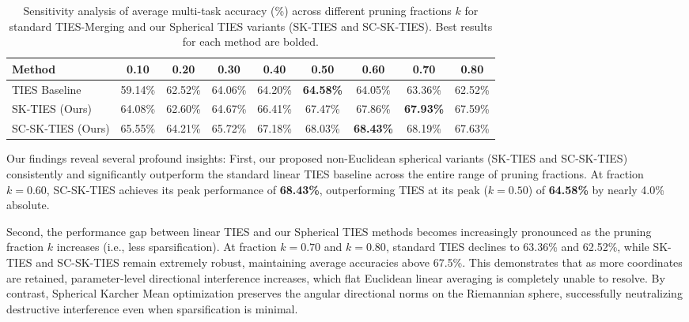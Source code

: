 \documentclass{article}
\begin{document}
\begin{table}[h]
\caption{Sensitivity analysis of average multi-task accuracy (\%) across different pruning fractions $k$ for standard TIES-Merging and our Spherical TIES variants (SK-TIES and SC-SK-TIES). Best results for each method are bolded.}
\label{table:fraction_sweep}
\vskip 0.15in
\begin{center}
\begin{small}
\begin{tabular}{lcccccccc}
\toprule
\textbf{Method} & \textbf{0.10} & \textbf{0.20} & \textbf{0.30} & \textbf{0.40} & \textbf{0.50} & \textbf{0.60} & \textbf{0.70} & \textbf{0.80} \\
\midrule
TIES Baseline & 59.14\% & 62.52\% & 64.06\% & 64.20\% & \textbf{64.58\%} & 64.05\% & 63.36\% & 62.52\% \\
SK-TIES (Ours) & 64.08\% & 62.60\% & 64.67\% & 66.41\% & 67.47\% & 67.86\% & \textbf{67.93\%} & 67.59\% \\
SC-SK-TIES (Ours) & 65.55\% & 64.21\% & 65.72\% & 67.18\% & 68.03\% & \textbf{68.43\%} & 68.19\% & 67.63\% \\
\bottomrule
\end{tabular}
\end{small}
\end{center}
\vskip -0.1in
\end{table}

Our findings reveal several profound insights:
First, our proposed non-Euclidean spherical variants (SK-TIES and SC-SK-TIES) consistently and significantly outperform the standard linear TIES baseline across the entire range of pruning fractions. At fraction $k=0.60$, SC-SK-TIES achieves its peak performance of \textbf{68.43\%}, outperforming TIES at its peak ($k=0.50$) of \textbf{64.58\%} by nearly 4.0\% absolute. 

Second, the performance gap between linear TIES and our Spherical TIES methods becomes increasingly pronounced as the pruning fraction $k$ increases (i.e., less sparsification). At fraction $k=0.70$ and $k=0.80$, standard TIES declines to 63.36\% and 62.52\%, while SK-TIES and SC-SK-TIES remain extremely robust, maintaining average accuracies above 67.5\%. This demonstrates that as more coordinates are retained, parameter-level directional interference increases, which flat Euclidean linear averaging is completely unable to resolve. By contrast, Spherical Karcher Mean optimization preserves the angular directional norms on the Riemannian sphere, successfully neutralizing destructive interference even when sparsification is minimal.
\end{document}
